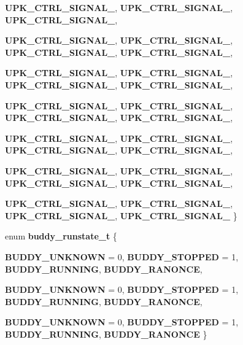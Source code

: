 \begin{DoxyCompactItemize}
{\bf UPK\_\-CTRL\_\-SIGNAL\_}, 
{\bf UPK\_\-CTRL\_\-SIGNAL\_}, 
{\bf UPK\_\-CTRL\_\-SIGNAL\_}, 
\par
{\bf UPK\_\-CTRL\_\-SIGNAL\_}, 
{\bf UPK\_\-CTRL\_\-SIGNAL\_}, 
{\bf UPK\_\-CTRL\_\-SIGNAL\_}, 
{\bf UPK\_\-CTRL\_\-SIGNAL\_}, 
\par
{\bf UPK\_\-CTRL\_\-SIGNAL\_}, 
{\bf UPK\_\-CTRL\_\-SIGNAL\_}, 
{\bf UPK\_\-CTRL\_\-SIGNAL\_}, 
{\bf UPK\_\-CTRL\_\-SIGNAL\_}, 
\par
{\bf UPK\_\-CTRL\_\-SIGNAL\_}, 
{\bf UPK\_\-CTRL\_\-SIGNAL\_}, 
{\bf UPK\_\-CTRL\_\-SIGNAL\_}, 
{\bf UPK\_\-CTRL\_\-SIGNAL\_}, 
\par
{\bf UPK\_\-CTRL\_\-SIGNAL\_}, 
{\bf UPK\_\-CTRL\_\-SIGNAL\_}, 
{\bf UPK\_\-CTRL\_\-SIGNAL\_}, 
{\bf UPK\_\-CTRL\_\-SIGNAL\_}, 
\par
{\bf UPK\_\-CTRL\_\-SIGNAL\_}, 
{\bf UPK\_\-CTRL\_\-SIGNAL\_}, 
{\bf UPK\_\-CTRL\_\-SIGNAL\_}, 
{\bf UPK\_\-CTRL\_\-SIGNAL\_}, 
\par
{\bf UPK\_\-CTRL\_\-SIGNAL\_}, 
{\bf UPK\_\-CTRL\_\-SIGNAL\_}, 
{\bf UPK\_\-CTRL\_\-SIGNAL\_}, 
{\bf UPK\_\-CTRL\_\-SIGNAL\_}
 \}
\item 
enum {\bf buddy\_\-runstate\_\-t} \{ \par
{\bf BUDDY\_\-UNKNOWN} =  0, 
{\bf BUDDY\_\-STOPPED} =  1, 
{\bf BUDDY\_\-RUNNING}, 
{\bf BUDDY\_\-RANONCE}, 
\par
{\bf BUDDY\_\-UNKNOWN} =  0, 
{\bf BUDDY\_\-STOPPED} =  1, 
{\bf BUDDY\_\-RUNNING}, 
{\bf BUDDY\_\-RANONCE}, 
\par
{\bf BUDDY\_\-UNKNOWN} =  0, 
{\bf BUDDY\_\-STOPPED} =  1, 
{\bf BUDDY\_\-RUNNING}, 
{\bf BUDDY\_\-RANONCE}
 \}
\end{DoxyCompactItemize}

